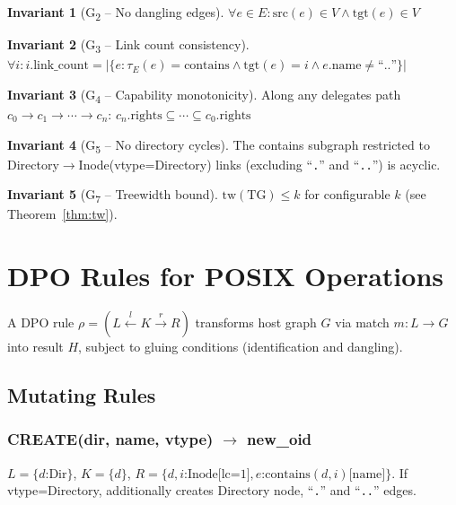 \documentclass[11pt,a4paper,twoside]{report}
\theoremstyle{definition}
\newtheorem{invariant}{Invariant}[chapter]
\newcommand{\TG}{\mathrm{TG}}
\begin{document}
\begin{invariant}[G\textsubscript{2} -- No dangling edges]
$\forall e \in E: \mathrm{src}(e) \in V \wedge \mathrm{tgt}(e) \in V$
\end{invariant}

\begin{invariant}[G\textsubscript{3} -- Link count consistency]
$\forall i: i.\text{link\_count} = |\{e : \tau_E(e)=\text{contains} \wedge \mathrm{tgt}(e)=i \wedge e.\text{name} \neq \text{``..''}\}|$
\end{invariant}

\begin{invariant}[G\textsubscript{4} -- Capability monotonicity]
Along any delegates path $c_0 \to c_1 \to \cdots \to c_n$:
$c_n.\text{rights} \subseteq \cdots \subseteq c_0.\text{rights}$
\end{invariant}

\begin{invariant}[G\textsubscript{5} -- No directory cycles]
The contains subgraph restricted to Directory$\to$Inode(vtype=Directory) links (excluding ``\texttt{.}'' and ``\texttt{..}'') is acyclic.
\end{invariant}

\begin{invariant}[G\textsubscript{7} -- Treewidth bound]
$\mathrm{tw}(\TG) \leq k$ for configurable $k$ (see Theorem~\ref{thm:tw}).
\end{invariant}

\chapter{DPO Rules for POSIX Operations}

A DPO rule $\rho = (L \xleftarrow{l} K \xrightarrow{r} R)$ transforms host graph $G$ via match $m: L \to G$ into result $H$, subject to gluing conditions (identification and dangling).

\section{Mutating Rules}

\subsection{CREATE(dir, name, vtype) $\to$ new\_oid}
$L = \{d\text{:Dir}\}$, $K = \{d\}$, $R = \{d, i\text{:Inode[lc=1]}, e\text{:contains}(d,i)\text{[name]}\}$.
If vtype=Directory, additionally creates Directory node, ``\texttt{.}'' and ``\texttt{..}'' edges.
\end{document}
